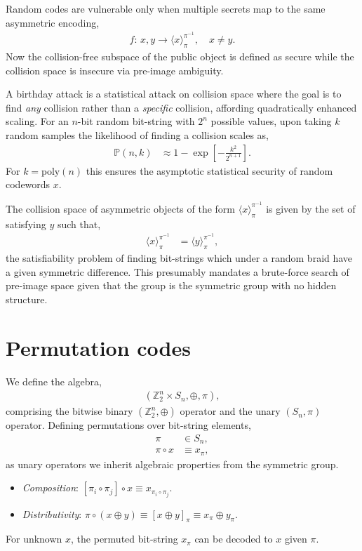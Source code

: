 \documentclass[twocolumn, aps, amsmath, amssymb, nofootinbib, superscriptaddress, longbibliography, doublefloatfix, table-of-contents, eqsecnum, rmp]{revtex4-2}
\def\selfbraid#1#2#3{\langle#1\rangle_{#2}^{#3}}
\begin{document}
Random codes are vulnerable only when multiple secrets map to the same asymmetric encoding,
\begin{align}
	f:\, x,y \to \selfbraid{x}{\pi}{\pi^{-1}},\quad x\neq y.
\end{align}
Now the collision-free subspace of the public object is defined as secure while the collision space is insecure via pre-image ambiguity.

A birthday attack is a statistical attack on collision space where the goal is to find \emph{any} collision rather than a \emph{specific} collision, affording quadratically enhanced scaling. For an $n$-bit random bit-string with $2^n$ possible values, upon taking $k$ random samples the likelihood of finding a collision scales as,
\begin{align}
	\mathbb{P}(n,k) &\approx 1 - \exp\left[-\frac{k^2}{2^{n+1}}\right].
\end{align}
For $k=\mathrm{poly}(n)$ this ensures the asymptotic statistical security of random codewords $x$.

The collision space of asymmetric objects of the form $\selfbraid{x}{\pi}{\pi^{-1}}$ is given by the set of satisfying $y$ such that,
\begin{align}
	\selfbraid{x}{\pi}{\pi^{-1}} &= \selfbraid{y}{\pi}{\pi^{-1}},
\end{align}
the satisfiability problem of finding bit-strings which under a random braid have a given symmetric difference. This presumably mandates a brute-force search of pre-image space given that the group is the symmetric group with no hidden structure.


\section{Permutation codes}

We define the algebra,
\begin{align}
	(\mathbb{Z}_2^n \times S_n, \oplus,\pi),
\end{align}
comprising the bitwise binary $(\mathbb{Z}_2^n,\oplus)$ operator and the unary $(S_n,\pi)$ operator. Defining permutations over bit-string elements,
\begin{align}
	\pi &\in S_n,\nonumber\\
	\pi\circ x &\equiv x_\pi,
\end{align}
as unary operators we inherit algebraic properties from the symmetric group.
\begin{itemize}
	\item \emph{Composition}: $[\pi_i \circ \pi_j]\circ x \equiv x_{\pi_i\circ \pi_j}$.
	\item \emph{Distributivity}: $\pi\circ(x\oplus y) \equiv [x\oplus y]_\pi \equiv x_\pi \oplus y_\pi$.
\end{itemize}
For unknown $x$, the permuted bit-string $x_\pi$ can be decoded to $x$ given $\pi$.
\end{document}

